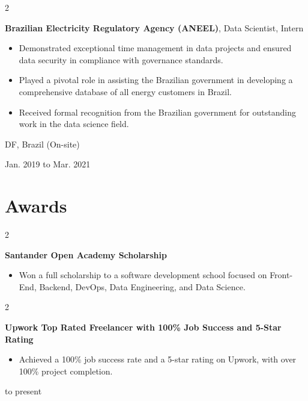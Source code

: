 \documentclass[10pt, letterpaper]{article}
\newenvironment{highlights}{
    \begin{itemize}[
        topsep=0.10 cm,
        parsep=0.10 cm,
        partopsep=0pt,
        itemsep=0pt,
        leftmargin=0.4 cm + 10pt
    ]
}{
    \end{itemize}
} %
\newenvironment{twocolentry}[2][]{
    \onecolentry
    \def\secondColumn{#2}
    \setcolumnwidth{\fill, 4.5 cm}
    \begin{paracol}{2}
}{
    \switchcolumn \raggedleft \secondColumn
    \end{paracol}
    \endonecolentry
} %
\begin{document}
        \begin{twocolentry}{
            DF, Brazil (On-site)

        Jan. 2019 to Mar. 2021
        }
            \textbf{Brazilian Electricity Regulatory Agency (ANEEL)}, Data Scientist, Intern
            \begin{highlights}
                \item Demonstrated exceptional time management in data projects and ensured data security in compliance with governance standards.
                \item Played a pivotal role in assisting the Brazilian government in developing a comprehensive database of all energy customers in Brazil.
                \item Received formal recognition from the Brazilian government for outstanding work in the data science field.
            \end{highlights}
        \end{twocolentry}



    
    \section{Awards}



        
        \begin{twocolentry}{
            2024
        }
            \textbf{Santander Open Academy Scholarship}
            \begin{highlights}
                \item Won a full scholarship to a software development school focused on Front-End, Backend, DevOps, Data Engineering, and Data Science.
            \end{highlights}
        \end{twocolentry}


        \vspace{0.2 cm}

        \begin{twocolentry}{
            2022 to present
        }
            \textbf{Upwork Top Rated Freelancer with 100\% Job Success and 5-Star Rating}
            \begin{highlights}
                \item Achieved a 100\% job success rate and a 5-star rating on Upwork, with over 100\% project completion.
            \end{highlights}
        \end{twocolentry}
\end{document}
